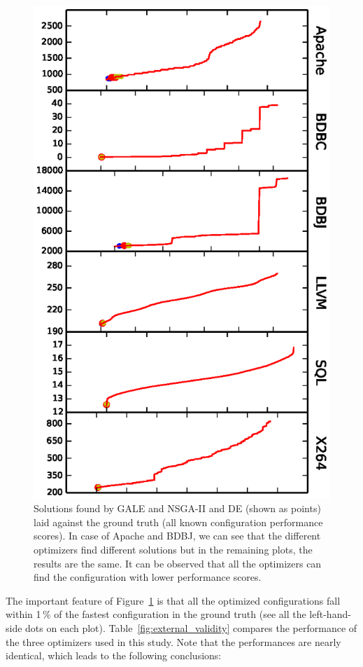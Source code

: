 \documentclass{newsig}
\newcommand{\fig}[1]{Figure~\ref{fig:#1}}
\begin{document}
\begin{figure}[!t]
\includegraphics[width=0.9\linewidth]{Figures/optimizer_result.eps}
\caption{Solutions found by GALE and NSGA-II and DE (shown as points) laid against the ground truth (all known configuration performance scores). In case of Apache and BDBJ, we can see that the different optimizers find different solutions but in the remaining plots, the results are the same. It can be observed that all the optimizers can find the configuration with  lower performance scores.}\label{fig:performance_graph}
\end{figure}


The important feature of \fig{performance_graph} is that all the optimized configurations fall within 1\,\% of the fastest
configuration in the ground truth (see all the left-hand-side dots on each plot). Table~\ref{fig:external_validity} compares the performance of the three optimizers
used in this study. Note that the performances are nearly identical, which leads to the following conclusions:
\end{document}
